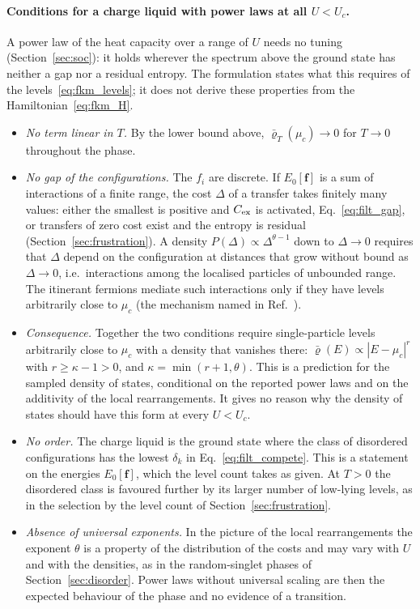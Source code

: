 \documentclass[10pt,a4paper]{article}
\theoremstyle{plain}
\begin{document}
\paragraph{Conditions for a charge liquid with power laws at all
$U<U_c$.} A power law of the heat capacity over a range of $U$ needs no
tuning (Section~\ref{sec:soc}): it holds wherever the spectrum above the
ground state has neither a gap nor a residual entropy. The formulation
states what this requires of the levels~\eqref{eq:fkm_levels}; it does not
derive these properties from the Hamiltonian~\eqref{eq:fkm_H}.
\begin{itemize}\setlength{\itemsep}{2pt}
\item \emph{No term linear in $T$.} By the lower bound above,
  $\bar\varrho_T(\mu_c)\to0$ for $T\to0$ throughout the phase.
\item \emph{No gap of the configurations.} The $f_i$ are discrete. If
  $E_0[\mathbf f]$ is a sum of interactions of a finite range, the cost
  $\Delta$ of a transfer takes finitely many values: either the smallest is
  positive and $C_{\rm ex}$ is activated, Eq.~\eqref{eq:filt_gap}, or
  transfers of zero cost exist and the entropy is residual
  (Section~\ref{sec:frustration}). A density $P(\Delta)\propto\Delta^{\theta-1}$
  down to $\Delta\to0$ requires that $\Delta$ depend on the configuration at
  distances that grow without bound as $\Delta\to0$, i.e.\ interactions among
  the localised particles of unbounded range. The itinerant fermions mediate
  such interactions only if they have levels arbitrarily close to $\mu_c$
  (the mechanism named in Ref.~\cite{Oliveira2019}).
\item \emph{Consequence.} Together the two conditions require single-particle
  levels arbitrarily close to $\mu_c$ with a density that vanishes there:
  $\bar\varrho(E)\propto|E-\mu_c|^{r}$ with $r\ge\kappa-1>0$, and
  $\kappa=\min(r+1,\theta)$. This is a prediction for the sampled density of
  states, conditional on the reported power laws and on the additivity of
  the local rearrangements. It gives no reason why the density of states
  should have this form at every $U<U_c$.
\item \emph{No order.} The charge liquid is the ground state where the class
  of disordered configurations has the lowest $\delta_k$ in
  Eq.~\eqref{eq:filt_compete}. This is a statement on the energies
  $E_0[\mathbf f]$, which the level count takes as given. At $T>0$ the
  disordered class is favoured further by its larger number of low-lying
  levels, as in the selection by the level count of
  Section~\ref{sec:frustration}.
\item \emph{Absence of universal exponents.} In the picture of the local
  rearrangements the exponent $\theta$ is a property of the distribution of
  the costs and may vary with $U$ and with the densities, as in the
  random-singlet phases of Section~\ref{sec:disorder}. Power laws without
  universal scaling are then the expected behaviour of the phase and no
  evidence of a transition.
\end{itemize}
\end{document}
